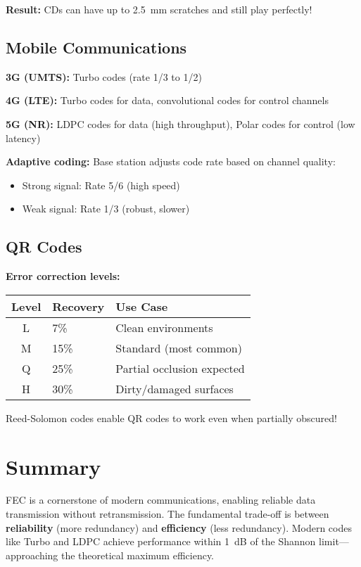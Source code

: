 \textbf{Result:} CDs can have up to 2.5~mm scratches and still play perfectly!

\subsection{Mobile Communications}

\textbf{3G (UMTS):} Turbo codes (rate 1/3 to 1/2)

\textbf{4G (LTE):} Turbo codes for data, convolutional codes for control channels

\textbf{5G (NR):} LDPC codes for data (high throughput), Polar codes for control (low latency)

\textbf{Adaptive coding:} Base station adjusts code rate based on channel quality:
\begin{itemize}
\item Strong signal: Rate 5/6 (high speed)
\item Weak signal: Rate 1/3 (robust, slower)
\end{itemize}

\subsection{QR Codes}

\textbf{Error correction levels:}
\begin{center}
\begin{tabular}{cll}
\toprule
\textbf{Level} & \textbf{Recovery} & \textbf{Use Case} \\
\midrule
L & 7\% & Clean environments \\
M & 15\% & Standard (most common) \\
Q & 25\% & Partial occlusion expected \\
H & 30\% & Dirty/damaged surfaces \\
\bottomrule
\end{tabular}
\end{center}

Reed-Solomon codes enable QR codes to work even when partially obscured!

\section{Summary}

\begin{keyconcept}
FEC is a cornerstone of modern communications, enabling reliable data transmission without retransmission. The fundamental trade-off is between \textbf{reliability} (more redundancy) and \textbf{efficiency} (less redundancy). Modern codes like Turbo and LDPC achieve performance within 1~dB of the Shannon limit---approaching the theoretical maximum efficiency.
\end{keyconcept}

